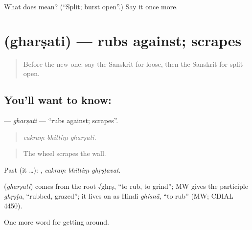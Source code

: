 \begin{tcolorbox}[breakable,colback=teal!4,colframe=teal!35!black,title={Before you move on}]
What does  mean? (\textquotedblleft{}Split; burst open\textquotedblright{}.) Say it once more.
\end{tcolorbox}
\section[\texorpdfstring{\sk{घर्षति} (gharṣati)}{घर्षति (gharṣati)}]{ (gharṣati) — rubs against; scrapes}

\label{lesson:SA-C410-gharsati}



\begin{quote}
Before the new one: say the Sanskrit for loose, then the Sanskrit for split open.
\end{quote}

\subsection*{You'll want to know: }
\textbf{} — \emph{gharṣati} — \textquotedblleft{}rubs against; scrapes\textquotedblright{}.

\begin{quote}
  
\end{quote}

\begin{quote}
\emph{cakraṃ bhittiṃ gharṣati.}
\end{quote}

\begin{quote}
The wheel scrapes the wall.
\end{quote}

Past (it …):   , \emph{cakraṃ bhittiṃ ghṛṣṭavat}.

\begin{cousinweb}
\textbf{} (\emph{gharṣati}) comes from the root √ghṛṣ, \textquotedblleft{}to rub, to grind\textquotedblright{}; MW gives the participle \emph{ghṛṣṭa}, \textquotedblleft{}rubbed, grazed\textquotedblright{}; it lives on as Hindi \emph{ghisnā}, \textquotedblleft{}to rub\textquotedblright{} (MW; CDIAL 4450).
\end{cousinweb}

\begin{grammarlens}[title={What you've built}]
One more word for getting around.
\end{grammarlens}

